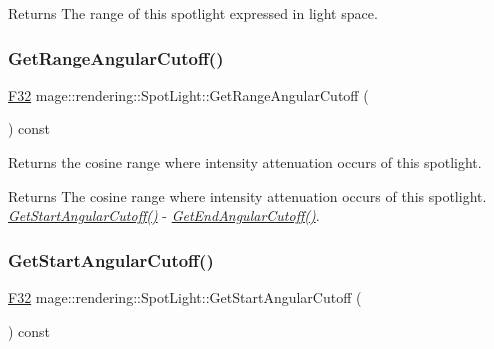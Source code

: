 \begin{DoxyReturn}{Returns}
The range of this spotlight expressed in light space. 
\end{DoxyReturn}
\mbox{\label{classmage_1_1rendering_1_1_spot_light_abd442757ce094619b8f4c050e54403e1}} 
\subsubsection{\texorpdfstring{Get\+Range\+Angular\+Cutoff()}{GetRangeAngularCutoff()}}
{\footnotesize\ttfamily \mbox{\hyperlink{namespacemage_aa97e833b45f06d60a0a9c4fc22ae02c0}{F32}} mage\+::rendering\+::\+Spot\+Light\+::\+Get\+Range\+Angular\+Cutoff (\begin{DoxyParamCaption}{ }\end{DoxyParamCaption}) const\hspace{0.3cm}{\ttfamily [noexcept]}}

Returns the cosine range where intensity attenuation occurs of this spotlight.

\begin{DoxyReturn}{Returns}
The cosine range where intensity attenuation occurs of this spotlight. {\itshape \mbox{\hyperlink{classmage_1_1rendering_1_1_spot_light_ab865663954e848ad42c84e759c7ceea7}{Get\+Start\+Angular\+Cutoff()}}} -\/ {\itshape \mbox{\hyperlink{classmage_1_1rendering_1_1_spot_light_aab94a7a9d5434d8e7913d7b52379841b}{Get\+End\+Angular\+Cutoff()}}}. 
\end{DoxyReturn}
\mbox{\label{classmage_1_1rendering_1_1_spot_light_ab865663954e848ad42c84e759c7ceea7}} 
\subsubsection{\texorpdfstring{Get\+Start\+Angular\+Cutoff()}{GetStartAngularCutoff()}}
{\footnotesize\ttfamily \mbox{\hyperlink{namespacemage_aa97e833b45f06d60a0a9c4fc22ae02c0}{F32}} mage\+::rendering\+::\+Spot\+Light\+::\+Get\+Start\+Angular\+Cutoff (\begin{DoxyParamCaption}{ }\end{DoxyParamCaption}) const\hspace{0.3cm}{\ttfamily [noexcept]}}

